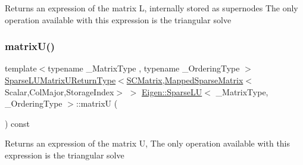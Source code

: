 \begin{DoxyReturn}{Returns}
an expression of the matrix L, internally stored as supernodes The only operation available with this expression is the triangular solve 
\begin{DoxyCode}{0}
\end{DoxyCode}
 
\end{DoxyReturn}
\mbox{\label{class_eigen_1_1_sparse_l_u_aaf395a8fca527144215ff19cc7b8b637}} 
\subsubsection{\texorpdfstring{matrixU()}{matrixU()}}
{\footnotesize\ttfamily template$<$typename \+\_\+\+Matrix\+Type , typename \+\_\+\+Ordering\+Type $>$ \\
\mbox{\hyperlink{struct_eigen_1_1_sparse_l_u_matrix_u_return_type}{Sparse\+L\+U\+Matrix\+U\+Return\+Type}}$<$\mbox{\hyperlink{class_eigen_1_1internal_1_1_mapped_super_nodal_matrix}{S\+C\+Matrix}},\mbox{\hyperlink{class_eigen_1_1_mapped_sparse_matrix}{Mapped\+Sparse\+Matrix}}$<$Scalar,Col\+Major,Storage\+Index$>$ $>$ \mbox{\hyperlink{class_eigen_1_1_sparse_l_u}{Eigen\+::\+Sparse\+LU}}$<$ \+\_\+\+Matrix\+Type, \+\_\+\+Ordering\+Type $>$\+::matrixU (\begin{DoxyParamCaption}{ }\end{DoxyParamCaption}) const\hspace{0.3cm}{\ttfamily [inline]}}

\begin{DoxyReturn}{Returns}
an expression of the matrix U, The only operation available with this expression is the triangular solve 
\begin{DoxyCode}{0}
\end{DoxyCode}
 
\end{DoxyReturn}
\mbox{\label{class_eigen_1_1_sparse_l_u_a691295e65c06df599876d78ac2c7fada}} 

